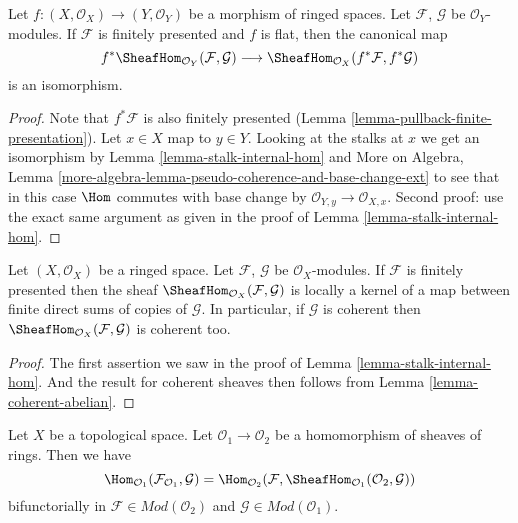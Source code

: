 \begin{lemma}
\label{lemma-pullback-internal-hom}
Let $f : (X, \mathcal{O}_X) \to (Y, \mathcal{O}_Y)$ be a morphism
of ringed spaces. Let $\mathcal{F}$, $\mathcal{G}$ be $\mathcal{O}_Y$-modules.
If $\mathcal{F}$ is finitely presented and $f$ is flat,
then the canonical map
$$
f^*\SheafHom_{\mathcal{O}_Y}(\mathcal{F}, \mathcal{G})
\longrightarrow
\SheafHom_{\mathcal{O}_X}(f^*\mathcal{F}, f^*\mathcal{G})
$$
is an isomorphism.
\end{lemma}

\begin{proof}
Note that $f^*\mathcal{F}$ is also finitely presented
(Lemma \ref{lemma-pullback-finite-presentation}).
Let $x \in X$ map to $y \in Y$. Looking at the stalks
at $x$ we get an isomorphism by
Lemma \ref{lemma-stalk-internal-hom} and
More on Algebra, Lemma
\ref{more-algebra-lemma-pseudo-coherence-and-base-change-ext}
to see that in this case $\Hom$ commutes with base change by
$\mathcal{O}_{Y, y} \to \mathcal{O}_{X, x}$.
Second proof: use the exact same argument as given
in the proof of Lemma \ref{lemma-stalk-internal-hom}.
\end{proof}

\begin{lemma}
\label{lemma-internal-hom-locally-kernel-direct-sum}
Let $(X, \mathcal{O}_X)$ be a ringed space.
Let $\mathcal{F}$, $\mathcal{G}$ be $\mathcal{O}_X$-modules.
If $\mathcal{F}$ is finitely presented then the sheaf
$\SheafHom_{\mathcal{O}_X}(\mathcal{F}, \mathcal{G})$ is
locally a kernel of a map between finite direct sums
of copies of $\mathcal{G}$.
In particular, if $\mathcal{G}$ is coherent then
$\SheafHom_{\mathcal{O}_X}(\mathcal{F}, \mathcal{G})$
is coherent too.
\end{lemma}

\begin{proof}
The first assertion
we saw in the proof of Lemma \ref{lemma-stalk-internal-hom}.
And the result for coherent sheaves then follows from
Lemma \ref{lemma-coherent-abelian}.
\end{proof}

\begin{lemma}
\label{lemma-adjoint-tensor-restrict}
Let $X$ be a topological space. Let $\mathcal{O}_1 \to \mathcal{O}_2$
be a homomorphism of sheaves of rings. Then we have
$$
\Hom_{\mathcal{O}_1}(\mathcal{F}_{\mathcal{O}_1}, \mathcal{G}) =
\Hom_{\mathcal{O}_2}(\mathcal{F},
\SheafHom_{\mathcal{O}_1}(\mathcal{O}_2, \mathcal{G}))
$$
bifunctorially in $\mathcal{F} \in \textit{Mod}(\mathcal{O}_2)$
and $\mathcal{G} \in \textit{Mod}(\mathcal{O}_1)$.
\end{lemma}

